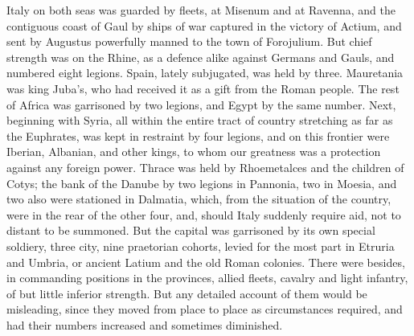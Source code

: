 
Italy on both seas was guarded by fleets, at Misenum and at Ravenna, and the contiguous coast of Gaul by ships of war captured in the victory of Actium, and sent by Augustus powerfully manned to the town of Forojulium. But chief strength was on the Rhine, as a defence alike against Germans and Gauls, and numbered eight legions. Spain, lately subjugated, was held by three. Mauretania was king Juba's, who had received it as a gift from the Roman people. The rest of Africa was garrisoned by two legions, and Egypt by the same number. Next, beginning with Syria, all within the entire tract of country stretching as far as the Euphrates, was kept in restraint by four legions, and on this frontier were Iberian, Albanian, and other kings, to whom our greatness was a protection against any foreign power. Thrace was held by Rhoemetalces and the children of Cotys; the bank of the Danube by two legions in Pannonia, two in Moesia, and two also were stationed in Dalmatia, which, from the situation of the country, were in the rear of the other four, and, should Italy suddenly require aid, not to distant to be summoned. But the capital was garrisoned by its own special soldiery, three city, nine praetorian cohorts, levied for the most part in Etruria and Umbria, or ancient Latium and the old Roman colonies. There were besides, in commanding positions in the provinces, allied fleets, cavalry and light infantry, of but little inferior strength. But any detailed account of them would be misleading, since they moved from place to place as circumstances required, and had their numbers increased and sometimes diminished.


